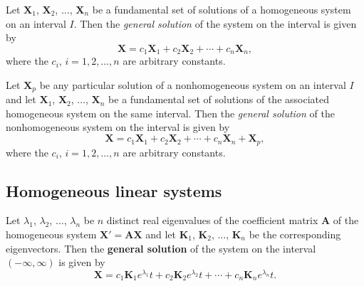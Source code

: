 \documentclass{article}
\begin{document}
\begin{thm} 
    Let \(\mathbf{X}_1\), \(\mathbf{X}_2\), \(\ldots\), \(\mathbf{X}_n\) be a fundamental set of solutions of a homogeneous system on an interval \(I\). Then the \emph{general solution} of the system on the interval is given by
    \begin{equation}
        \mathbf{X} = c_1\mathbf{X}_1 + c_2\mathbf{X}_2 + \cdots + c_n\mathbf{X}_n,
    \end{equation}
    where the \(c_i\), \(i = 1, 2, \ldots, n\) are arbitrary constants.
\end{thm}

\begin{thm} 
    Let \(\mathbf{X}_p\) be any particular solution of a nonhomogeneous system on an interval \(I\) and let \(\mathbf{X}_1\), \(\mathbf{X}_2\), \(\ldots\), \(\mathbf{X}_n\) be a fundamental set of solutions of the associated homogeneous system on the same interval. Then the \emph{general solution} of the nonhomogeneous system on the interval is given by
    \begin{equation}
        \mathbf{X} = c_1\mathbf{X}_1 + c_2\mathbf{X}_2 + \cdots + c_n\mathbf{X}_n + \mathbf{X}_p,
    \end{equation}
    where the \(c_i\), \(i = 1, 2, \ldots, n\) are arbitrary constants.
\end{thm}

\subsection{Homogeneous linear systems}

\begin{thm} 
    Let \(\lambda_1\), \(\lambda_2\), \(\ldots\), \(\lambda_n\) be \(n\) distinct real eigenvalues of the coefficient matrix \(\mathbf{A}\) of the homogeneous system \(\mathbf{X'} = \mathbf{AX}\) and let \(\mathbf{K}_1\), \(\mathbf{K}_2\), \(\ldots\), \(\mathbf{K}_n\) be the corresponding eigenvectors. Then the \textbf{general solution} of the system on the interval \((-\infty, \infty)\) is given by
    \begin{equation}
        \mathbf{X} = c_1\mathbf{K}_1 e^{\lambda_1}t + c_2\mathbf{K}_2 e^{\lambda_2}t + \cdots + c_n\mathbf{K}_n e^{\lambda_n}t.
    \end{equation}
\end{thm}
\end{document}
